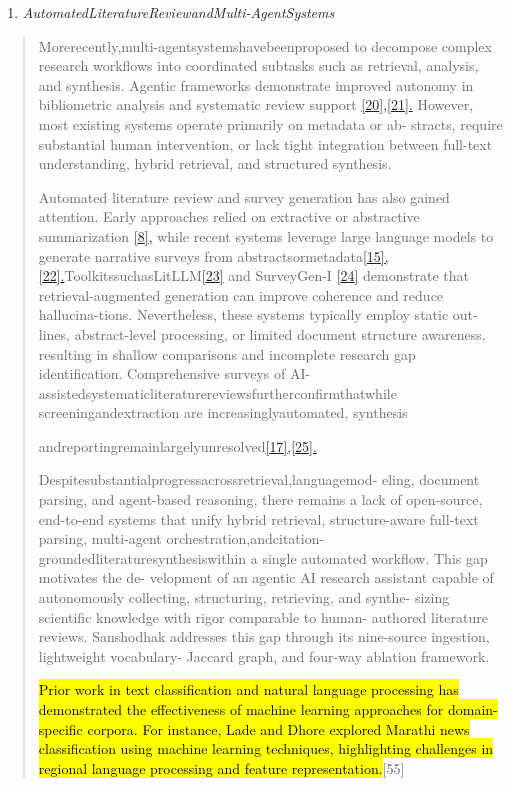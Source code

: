 \documentclass[
]{article}
\begin{document}
\begin{enumerate}
\def\labelenumi{\Alph{enumi}.}
\setcounter{enumi}{4}
\item
  \emph{AutomatedLiteratureReviewandMulti-AgentSystems}
\end{enumerate}

\begin{quote}
Morerecently,multi-agentsystemshavebeenproposed to decompose complex research workflows into coordinated subtasks such as retrieval, analysis, and synthesis. Agentic frameworks demonstrate improved autonomy in bibliometric analysis and systematic review support \hyperref[_bookmark36]{{[}20{]},}\hyperref[_bookmark37]{{[}21{]}.} However, most existing systems operate primarily on metadata or ab- stracts, require substantial human intervention, or lack tight integration between full-text understanding, hybrid retrieval, and structured synthesis.

Automated literature review and survey generation has also gained attention. Early approaches relied on extractive or abstractive summarization \hyperref[_bookmark27]{{[}8{]},} while recent systems leverage large language models to generate narrative surveys from abstractsormetadata\hyperref[_bookmark31]{{[}15{]},}\hyperref[_bookmark38]{{[}22{]}.}ToolkitssuchasLitLLM\hyperref[_bookmark39]{{[}23{]}} and SurveyGen-I \hyperref[_bookmark40]{{[}24{]}} demonstrate that retrieval-augmented generation can improve coherence and reduce hallucina-tions. Nevertheless, these systems typically employ static out- lines, abstract-level processing, or limited document structure awareness, resulting in shallow comparisons and incomplete research gap identification. Comprehensive surveys of AI- assistedsystematicliteraturereviewsfurtherconfirmthatwhile screeningandextraction are increasinglyautomated, synthesis

andreportingremainlargelyunresolved\hyperref[_bookmark33]{{[}17{]},}\hyperref[_bookmark41]{{[}25{]}.}

Despitesubstantialprogressacrossretrieval,languagemod- eling, document parsing, and agent-based reasoning, there remains a lack of open-source, end-to-end systems that unify hybrid retrieval, structure-aware full-text parsing, multi-agent orchestration,andcitation-groundedliteraturesynthesiswithin a single automated workflow. This gap motivates the de- velopment of an agentic AI research assistant capable of autonomously collecting, structuring, retrieving, and synthe- sizing scientific knowledge with rigor comparable to human- authored literature reviews. Sanshodhak addresses this gap through its nine-source ingestion, lightweight vocabulary- Jaccard graph, and four-way ablation framework.

\hl{Prior work in text classification and natural language processing has demonstrated the effectiveness of machine learning approaches for domain-specific corpora. For instance, Lade and Dhore explored Marathi news classification using machine learning techniques, highlighting challenges in regional language processing and feature representation.}{[}55{]}
\end{quote}
\end{document}
